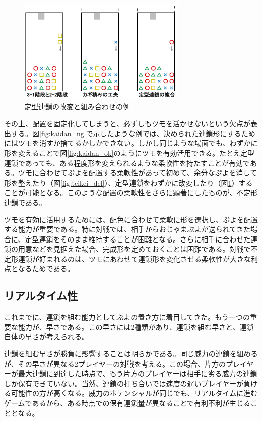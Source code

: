 \documentclass[12pt]{jreport}
\begin{document}
\begin{figure}[tbp]
  \begin{center}
  \includegraphics[height=5cm]{img/teikei_combi.png}
  \caption{定型連鎖の改変と組み合わせの例} \label{fig:teikei_combi}
\end{center}
\end{figure}

その上、配置を固定化してしまうと、必ずしもツモを活かせないという欠点が表出する。図\ref{fig:kaidan_ng}で示したような例では、決められた連鎖形にするためにはツモを消すか捨てるかしかできない。しかし同じような場面でも、わずかに形を変えることで図\ref{fig:kaidan_ok}のようにツモを有効活用できる。たとえ定型連鎖であっても、ある程度形を変えられるような柔軟性を持たすことが有効である。ツモに合わせてぷよを配置する柔軟性があって初めて、余分なぷよを消して形を整えたり（図\ref{fig:teikei_del}）、定型連鎖をわずかに改変したり（図\ref{fig:teikei_combi}）することが可能となる。このような配置の柔軟性をさらに顕著にしたものが、不定形連鎖である。


ツモを有効に活用するためには、配色に合わせて柔軟に形を選択し、ぷよを配置する能力が重要である。特に対戦では、相手からおじゃまぷよが送られてきた場合に、定型連鎖をそのまま維持することが困難となる。さらに相手に合わせた連鎖の用意などを見据えた場合、完成形を定めておくことは困難である。対戦で不定形連鎖が好まれるのは、ツモにあわせて連鎖形を変化させる柔軟性が大きな利点となるためである。


\subsection{リアルタイム性}
これまでに、連鎖を組む能力としてぷよの置き方に着目してきた。もう一つの重要な能力が、早さである。この早さには2種類があり、連鎖を組む早さと、連鎖自体の早さが考えられる。

連鎖を組む早さが勝負に影響することは明らかである。同じ威力の連鎖を組めるが、その早さが異なる2プレイヤーの対戦を考える。この場合、片方のプレイヤーが最大連鎖に到達した時点で、もう片方のプレイヤーは相手に劣る威力の連鎖しか保有できていない。当然、連鎖の打ち合いでは速度の遅いプレイヤーが負ける可能性の方が高くなる。威力のポテンシャルが同じでも、リアルタイムに進むゲームであるから、ある時点での保有連鎖量が異なることで有利不利が生じることとなる。
\end{document}
